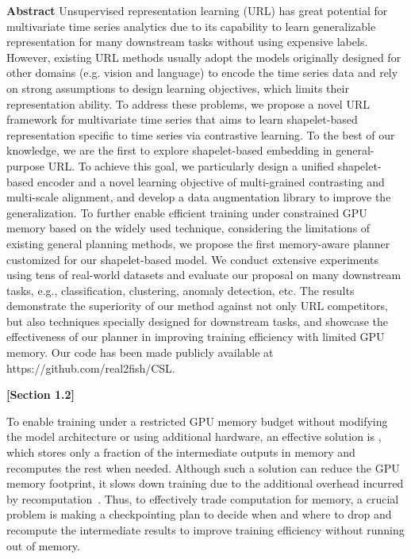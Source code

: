 \begin{sloppypar}
\begin{framed}
\noindent
    \textbf{Abstract} Unsupervised representation learning (URL) has great potential for multivariate time series analytics due to its capability to learn generalizable representation for many downstream tasks without using expensive labels. However, existing URL methods usually adopt the models originally designed for other domains (e.g. vision and language) to encode the time series data and {rely on strong assumptions to design learning objectives, which limits their representation ability}. To address these problems, we propose a novel URL framework for multivariate time series that aims to learn shapelet-based representation specific to time series via contrastive learning. To the best of our knowledge, we are the first to explore shapelet-based embedding in general-purpose URL. To achieve this goal, we particularly design a unified shapelet-based encoder and a novel learning objective of multi-grained contrasting and multi-scale alignment, and develop a data augmentation library to improve the generalization. To further enable efficient training under constrained GPU memory based on the widely used  technique, considering the limitations of existing general  planning methods, we propose the first memory-aware
 planner customized for our shapelet-based model.  We conduct extensive experiments using tens of real-world datasets and evaluate our proposal on many downstream tasks, e.g., classification, clustering, anomaly detection, etc. The results demonstrate the superiority of our method against not only URL competitors, but also techniques specially designed for downstream tasks, and showcase the effectiveness of our  planner in improving training efficiency with limited GPU memory. Our code has been made publicly available at https://github.com/real2fish/CSL.

    \textbf{[Section 1.2]}

    To enable training under a restricted GPU memory budget without modifying the model architecture or using additional hardware, an effective solution is \footnotemark[2], which stores only a fraction of the intermediate outputs in memory and recomputes the rest when needed. Although such a solution can reduce the GPU memory footprint, it slows down training due to the additional overhead incurred by  recomputation~\cite{mimose}. Thus, to effectively trade computation for memory, a crucial problem is making a checkpointing plan to decide when and where to drop and recompute the intermediate results to improve training efficiency without running out of memory. 
\end{framed}


\end{sloppypar}
